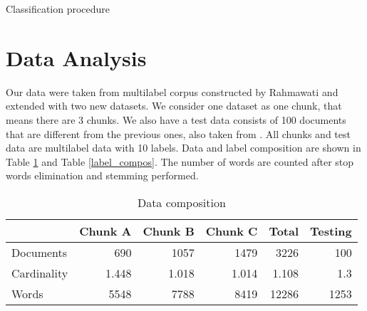 \documentclass[conference]{IEEEtran}
\makeatletter
\def\BState{\State\hskip-\ALG@thistlm}
\newcommand{\argmax}{\arg\!\max}
\makeatother
\begin{document}
\begin{algorithm}[!htb]
\caption{Classification procedure}
\label{algo_classify}
\end{algorithm}

\section{Data Analysis}

Our data were taken from multilabel corpus constructed by Rahmawati \cite{rahma} and extended with two new datasets.
We consider one dataset as one chunk, that means there are 3 chunks.
We also have a test data consists of 100 documents that are different from the previous ones, also taken from \cite{rahma}.
All chunks and test data are multilabel data with 10 labels.
Data and label composition are shown in Table \ref{data_compos} and Table \ref{label_compos}.
The number of words are counted after stop words elimination and stemming performed.

\begin{table}[!htb]
\renewcommand{\arraystretch}{1.3}
\caption{Data composition}
\label{data_compos}
\centering
\begin{tabular}{|l|r|r|r|r|r|}
    \hline
     & Chunk A & Chunk B & Chunk C & \textbf{Total} & Testing\\
    \hline
    Documents & 690 & 1057 & 1479 & 3226 & 100\\
    \hline
    Cardinality & 1.448 & 1.018 & 1.014 & 1.108 & 1.3\\
    \hline
    Words & 5548 & 7788 & 8419 & 12286 & 1253\\
    \hline
\end{tabular}
\end{table}
\end{document}
